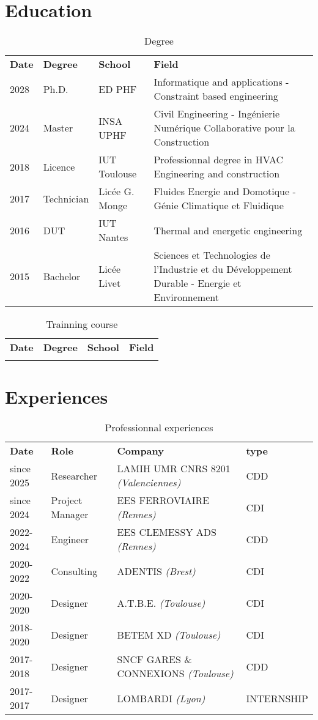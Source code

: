 \documentclass[a4paper,12pt]{article}
\begin{document}
\section{Education}
\label{sec:org464448e}
\begin{longtable}{|p{2cm}|p{3cm}|p{5cm}|p{7cm}|}
\caption{Degree}
\\
\textbf{Date} & \textbf{Degree} & \textbf{School} & \textbf{Field}\\
2028 & Ph.D. & ED PHF & Informatique and applications - Constraint based engineering\\
2024 & Master & INSA UPHF & Civil Engineering - Ingénierie Numérique Collaborative pour la Construction\\
2018 & Licence & IUT Toulouse & Professionnal degree in HVAC Engineering and construction\\
2017 & Technician & Licée G. Monge & Fluides Energie and Domotique - Génie Climatique et Fluidique\\
2016 & DUT & IUT Nantes & Thermal and energetic engineering\\
2015 & Bachelor & Licée Livet & Sciences et Technologies de l’Industrie et du Développement Durable - Energie et Environnement\\
\end{longtable}

\begin{longtable}{|p{2cm}|p{3cm}|p{5cm}|p{7cm}|}
\caption{Trainning course}
\\
\textbf{Date} & \textbf{Degree} & \textbf{School} & \textbf{Field}\\
 &  &  & \\
\end{longtable}
\section{Experiences}
\label{sec:org2405a38}
\begin{longtable}{|p{2cm}|p{3cm}|p{5cm}|p{7cm}|}
\caption{Professionnal experiences}
\\
\textbf{Date} & \textbf{Role} & \textbf{Company} & \textbf{type}\\
since 2025 & Researcher & LAMIH UMR CNRS 8201 \emph{(Valenciennes)} & CDD\\
since 2024 & Project Manager & EES FERROVIAIRE \emph{(Rennes)} & CDI\\
2022-2024 & Engineer & EES CLEMESSY ADS \emph{(Rennes)} & CDD\\
2020-2022 & Consulting & ADENTIS \emph{(Brest)} & CDI\\
2020-2020 & Designer & A.T.B.E. \emph{(Toulouse)} & CDI\\
2018-2020 & Designer & BETEM XD \emph{(Toulouse)} & CDI\\
2017-2018 & Designer & SNCF GARES \& CONNEXIONS \emph{(Toulouse)} & CDD\\
2017-2017 & Designer & LOMBARDI \emph{(Lyon)} & INTERNSHIP\\
\end{longtable}
\end{document}
